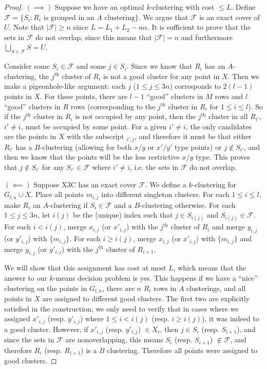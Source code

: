 \begin{proof}
$(\implies)$ Suppose we have an optimal $k$-clustering with cost $\le L$. Define $\mathcal{F}=\{S_i:R_i\text{ is grouped in an $A$ clustering}\}$. We argue that $\mathcal{F}$ is an exact cover of $U$. Note that $|\mathcal{F}|\ge n$ since $L = L_1+L_2-n\alpha$. It is sufficient to prove that the sets in $\mathcal{F}$ do not overlap, since this means that $|\mathcal{F}| = n$ and furthermore $\bigcup_{S\in\mathcal{F}}S=U$. 

Consider some $S_i\in\mathcal{F}$ and some $j\in S_i$. Since we know that $R_i$ has an $A$-clustering, the $j^{\text{th}}$ cluster of $R_i$ is not a good cluster for any point in $X$. Then we make a pigeonhole-like argument: each $j$ ($1\le j \le 3n$) corresponds to $2(l-1)$ points in $X$. For these points, there are $l-1$ ``good'' clusters in $M$ rows and $l$ ``good'' clusters in $R$ rows (corresponding to the $j^{\text{th}}$ cluster in $R_i$ for $1\le i\le l$). So if the $j^{\text{th}}$ cluster in $R_i$ is not occupied by any point, then the $j^{\text{th}}$ cluster in all $R_{i'}$, $i'\ne i$, must be occupied by some point. For a given $i'\ne i$, the only candidates are the points in $X$ with the subscript $_{i',j}$, and therefore it must be that either $R_{i'}$ has a $B$-clustering (allowing for both $x/y$ or $x'/y'$ type points) or $j\not\in S_{i'}$, and then we know that the points will be the less restrictive $x/y$ type. This proves that $j\not\in S_{i'}$ for any $S_{i'}\in\mathcal{F}$ where $i'\ne i$, i.e. the sets in $\mathcal{F}$ do not overlap.

$(\impliedby)$ Suppose X3C has an exact cover $\mathcal{F}$. We define a $k$-clustering for $G_{l,n}\cup X$. Place all points $m_{i,j}$ into different singleton clusters. For each $1\le i \le l$, make $R_i$ an $A$-clustering if $S_i\in\mathcal{F}$ and a $B$-clustering otherwise. For each $1\le j \le 3n$, let $i(j)$ be the (unique) index such that $j\in S_{i(j)}$ and $S_{i(j)}\in\mathcal{F}$. For each $i<i(j)$, merge $x_{i,j}$ (or $x'_{i,j}$) with the $j^{\text{th}}$ cluster of $R_i$ and merge $y_{i,j}$ (or $y'_{i,j}$) with $\{m_{i,j}\}$. For each $i\ge i(j)$, merge $x_{i,j}$ (or $x'_{i,j}$) with $\{m_{i,j}\}$ and merge $y_{i,j}$ (or $y'_{i,j}$) with the $j^{\text{th}}$ cluster of $R_{i+1}$.

We will show that this assignment has cost at most $L$, which means that the answer to our $k$-means decision problem is yes. This happens if we have a ``nice'' clustering on the points in $G_{l,n}$, there are $n$ $R_i$ rows in $A$ clusterings, and all points in $X$ are assigned to different good clusters. The first two are explicitly satisfied in the construction; we only need to verify that in cases where we assigned $x'_{i,j}$ (resp. $y'_{i,j}$) where $1\le i < i(j)$ (resp. $i\ge i(j)$), it was indeed to a good cluster. However, if $x'_{i,j}$ (resp. $y'_{i,j}$) $\in X_i$, then $j\in S_i$ (resp. $S_{i+1}$), and since the sets in $\mathcal{F}$ are nonoverlapping, this means $S_i$ (resp. $S_{i+1}$) $\not\in\mathcal{F}$, and therefore $R_i$ (resp. $R_{i+1}$) is a $B$ clustering. Therefore all points were assigned to good clusters.
\end{proof}
